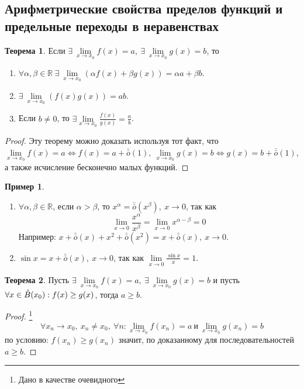\documentclass[a4paper, 12pt]{article}
\newcommand{\R}{\mathbb{R}}
\newcommand{\Bo}{\mathring{B}}
\newcommand\tab[1][.5cm]{\hspace*{#1}}
\newcommand{\om}{\bar{\bar{o}}}
\theoremstyle{definition}
\newtheorem*{theorem}{Теорема}
\newtheorem*{example}{Пример}
\begin{document}
    \subsection{Арифметрические свойства пределов функций и предельные переходы в неравенствах}
        \begin{theorem}
            Если $\exists\ \lim\limits_{x\to x_0}f(x)=a,\ \exists\ \lim\limits_{x\to x_0}g(x)=b$, то
            \begin{enumerate}
                \item $\forall \alpha,\beta\in \R\ \exists\ \lim\limits_{x\to x_0}(\alpha f(x)+\beta g(x))=\alpha a+\beta b$.
                \item $\exists\ \lim\limits_{x\to x_0}(f(x)g(x))=ab$.
                \item Если $b\ne 0$, то $\exists \lim\limits_{x\to x_0}\frac{f(x)}{g(x)}=\frac{a}{b}$.
            \end{enumerate}
        \end{theorem} 
        \begin{proof}
            Эту теорему можно доказать используя тот факт, что\\
            $\lim\limits_{x\to x_0}f(x)=a \Leftrightarrow f(x)=a+\bar{\bar{o}}{(1)},\ \lim\limits_{x\to x_0}g(x)=b \Leftrightarrow g(x)=b+\bar{\bar{o}}{(1)}$, а также исчисление бесконечно малых функций.
        \end{proof}
        \begin{example}\tab
            \begin{enumerate}
                \item $\forall \alpha,\beta\in \R$, если $\alpha>\beta$, то $x^{\alpha}=\om(x^{\beta}),\ x\to 0$, так как
                \[\lim\limits_{x\to 0}\frac{x^{\alpha}}{x^{\beta}}=\lim\limits_{x\to 0}x^{\alpha-\beta}=0\]
                Например: $x+\om(x)+x^2+\om(x^2)=x+\om(x),\ x\to 0$.
                \item $\sin{x}=x+\om(x),\ x\to 0$, так как $\lim\limits_{x\to 0}\frac{\sin{x}}{x}=1$.
            \end{enumerate}
        \end{example}
        \begin{theorem}
            Пусть $\exists\ \lim\limits_{x\to x_0}f(x)=a,\ \exists\ \lim\limits_{x\to x_0}g(x)=b$ и пусть $\forall x\in \Bo(x_0):\\
            f(x)\geq g(x)$, тогда $a\geq b$.
        \end{theorem} 
        \begin{proof}\footnote{Дано в качестве очевидного}
            \[\forall x_n \to x_0,\ x_n\ne x_0,\ \forall n: \lim\limits_{x\to x_0} f(x_n)=a\ \text{и}\ \lim\limits_{x\to x_0} g(x_n)=b\] 
            по условию: $f(x_n)\geq g(x_n)$ значит, по доказанному для последовательностей $a\geq b$.
        \end{proof} 
\end{document}
